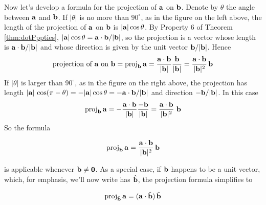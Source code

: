 Now let's develop a formula for the projection of $\mathbf{a}$ on $\mathbf{b}$.
Denote by $\theta$ the angle between $\mathbf{a}$ and $\mathbf{b}$. If $|\theta|$ is no
more than $90^\circ$, as in the figure on the left above, 
the length of the projection of $\mathbf{a}$ on $\mathbf{b}$ is 
$|\mathbf{a}|\cos\theta$.
By Property 6 of Theorem \ref{thm:dotPppties},  
$|\mathbf{a}|\cos\theta=\mathbf{a}\cdot\mathbf{b}/|\mathbf{b}|$, so the
projection is a vector whose length is $\mathbf{a}\cdot\mathbf{b}/|\mathbf{b}|$ and
whose direction is given by the unit vector $\mathbf{b}/|\mathbf{b}|$. Hence
\begin{align*}
\text{projection of $\mathbf{a}$ on $\mathbf{b}$}={\rm proj}_{\mathbf{b}}\,\mathbf{a}
=\frac{\mathbf{a}\cdot\mathbf{b}}{|\mathbf{b}|}\frac{\mathbf{b}}{|\mathbf{b}|}
=\frac{\mathbf{a}\cdot\mathbf{b}}{|\mathbf{b}|^2}\,\mathbf{b}
\end{align*}
If $|\theta|$ is larger than $90^\circ$, as in the figure on the right above, the projection has length 
$|\mathbf{a}|\,\cos(\pi-\theta)=-|\mathbf{a}|\cos\theta=-\mathbf{a}\cdot\mathbf{b}/|\mathbf{b}|$
 and direction $-\mathbf{b}/|\mathbf{b}|$. In this case
\begin{align*}
{\rm proj}_{\mathbf{b}}\,\mathbf{a}
=-\frac{\mathbf{a}\cdot\mathbf{b}}{|\mathbf{b}|}\frac{-\mathbf{b}}{|\mathbf{b}|}
=\frac{\mathbf{a}\cdot\mathbf{b}}{|\mathbf{b}|^2}\ \mathbf{b}
\end{align*}
So the formula 
\begin{impeqn}\label{eqn proj}
\begin{equation*}
{\rm proj}_{\mathbf{b}}\,\mathbf{a}=\frac{\mathbf{a}\cdot\mathbf{b}}{|\mathbf{b}|^2}\,\mathbf{b}
\end{equation*} 
\end{impeqn}\noindent
is applicable whenever $\mathbf{b}\ne\mathbf{0} $. As a special case, if $\mathbf{b}$ happens 
to be a unit vector, which, for emphasis, we'll now write has $\hat{\mathbf{b}}$, 
the projection formula simplifies to
\begin{impeqn}\label{eqn unit proj}
\begin{align*}
{\rm proj}_{\hat{\mathbf{b}}}\,\mathbf{a}
=  (\mathbf{a}\cdot\hat{\mathbf{b}})\,\hat{\mathbf{b}}
\end{align*}
\end{impeqn}

